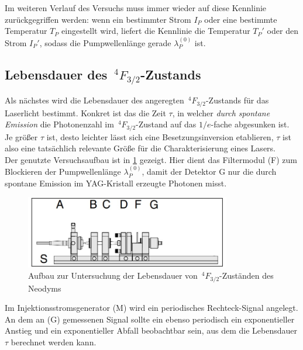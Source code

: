 \documentclass[../main.tex]{subfiles}
\begin{document}
        \begin{tcolorbox}
            Im weiteren Verlauf des Versuchs muss immer wieder auf diese Kennlinie zurückgegriffen werden: wenn ein bestimmter Strom $I_P$ oder eine bestimmte Temperatur $T_P$ eingestellt wird, liefert die Kennlinie die Temperatur $T_P'$ oder den Strom $I_P'$, sodass die Pumpwellenlänge gerade $\lambda_P^{(0)}$ ist.
        \end{tcolorbox}

    \subsection{Lebensdauer des $\,^4F_{3/2}$-Zustands}
        Als nächstes wird die Lebensdauer des angeregten $\,^4F_{3/2}$-Zustands für das Laserlicht bestimmt. Konkret ist das die Zeit $\tau$, in welcher \textit{durch spontane Emission} die Photonenzahl im $\,^4F_{3/2}$-Zustand auf das $1/e$-fache abgesunken ist. Je größer $\tau$ ist, desto leichter lässt sich eine Besetzungsinversion etablieren, $\tau$ ist also eine tatsächlich relevante Größe für die Charakterisierung eines Lasers.\\

        Der genutzte Versuchsaufbau ist in \ref{fig:AufbauTeil2} gezeigt. Hier dient das Filtermodul (F) zum Blockieren der Pumpwellenlänge $\lambda_P^{(0)}$, damit der Detektor G nur die durch spontane Emission im YAG-Kristall erzeugte Photonen misst.

        \begin{figure}[H]
            \centering
            \includegraphics[width=0.8\textwidth]{Bilddateien/Versuchsaufbau/Teil2.jpg}
            \caption{Aufbau zur Untersuchung der Lebensdauer von $\,^4F_{3/2}$-Zuständen des Neodyms \cite[p.30]{doc:experiment08}}
            \label{fig:AufbauTeil2}
        \end{figure}    

        Im Injektionsstromsgenerator (M) wird ein periodisches Rechteck-Signal angelegt. An dem an (G) gemessenen Signal sollte ein ebenso periodisch ein exponentieller Anstieg und ein exponentieller Abfall beobachtbar sein, aus dem die Lebensdauer $\tau$ berechnet werden kann.  
\end{document}
